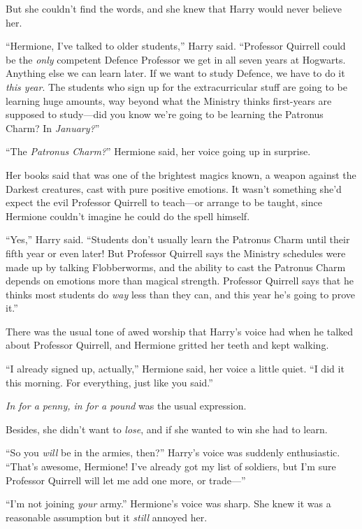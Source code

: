 But she couldn’t find the words, and she knew that Harry would never believe her.

“Hermione, I’ve talked to older students,” Harry said.
“Professor Quirrell could be the \emph{only} competent Defence Professor we get in all seven years at Hogwarts. Anything else we can learn later. If we want to study Defence, we have to do it \emph{this year}. The students who sign up for the extracurricular stuff are going to be learning huge amounts, way beyond what the Ministry thinks first-years are supposed to study—did you know we’re going to be learning the Patronus Charm? In \emph{January?}”

“The \emph{Patronus Charm?}” Hermione said, her voice going up in surprise.

Her books said that was one of the brightest magics known, a weapon against the Darkest creatures, cast with pure positive emotions. It wasn’t something she’d expect the evil Professor Quirrell to teach—or arrange to be taught, since Hermione couldn’t imagine he could do the spell himself.

“Yes,” Harry said.
“Students don’t usually learn the Patronus Charm until their fifth year or even later! But Professor Quirrell says the Ministry schedules were made up by talking Flobberworms, and the ability to cast the Patronus Charm depends on emotions more than magical strength. Professor Quirrell says that he thinks most students do \emph{way} less than they can, and this year he’s going to prove it.”

There was the usual tone of awed worship that Harry’s voice had when he talked about Professor Quirrell, and Hermione gritted her teeth and kept walking.

“I already signed up, actually,” Hermione said, her voice a little quiet.
“I did it this morning. For everything, just like you said.”

\emph{In for a penny, in for a pound} was the usual expression.

Besides, she didn’t want to \emph{lose}, and if she wanted to win she had to learn.

“So you \emph{will} be in the armies, then?” Harry’s voice was suddenly enthusiastic.
“That’s awesome, Hermione! I’ve already got my list of soldiers, but I’m sure Professor Quirrell will let me add one more, or trade—”

“I’m not joining \emph{your} army.” Hermione’s voice was sharp. She knew it was a reasonable assumption but it \emph{still} annoyed her.

